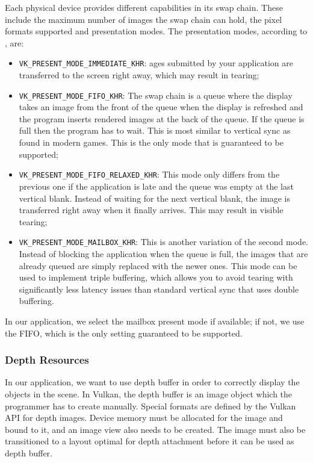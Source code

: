 Each physical device provides different capabilities in its swap chain. These include the maximum number of images the swap chain can hold, the pixel formats supported and presentation modes. The presentation modes, according to \cite{vulkan_tutorial}, are:
\begin{itemize}
    \item \texttt{VK\_PRESENT\_MODE\_IMMEDIATE\_KHR}: ages submitted by your application are transferred to the screen right away, which may result in tearing;
    \item \texttt{VK\_PRESENT\_MODE\_FIFO\_KHR}: The swap chain is a queue where the display takes an image from the front of the queue when the display is refreshed and the program inserts rendered images at the back of the queue. If the queue is full then the program has to wait. This is most similar to vertical sync as found in modern games. This is the only mode that is guaranteed to be supported;
    \item \texttt{VK\_PRESENT\_MODE\_FIFO\_RELAXED\_KHR}: This mode only differs from the previous one if the application is late and the queue was empty at the last vertical blank. Instead of waiting for the next vertical blank, the image is transferred right away when it finally arrives. This may result in visible tearing;
    \item \texttt{VK\_PRESENT\_MODE\_MAILBOX\_KHR}: This is another variation of the second mode. Instead of blocking the application when the queue is full, the images that are already queued are simply replaced with the newer ones. This mode can be used to implement triple buffering, which allows you to avoid tearing with significantly less latency issues than standard vertical sync that uses double buffering.
\end{itemize}

In our application, we select the mailbox present mode if available; if not, we use the FIFO, which is the only setting guaranteed to be supported.

\subsubsection{Depth Resources}
In our application, we want to use depth buffer in order to correctly display the objects in the scene. In Vulkan, the depth buffer is an image object which the programmer has to create manually. Special formats are defined by the Vulkan API for depth images. Device memory must be allocated for the image and bound to it, and an image view also needs to be created. The image must also be transitioned to a layout optimal for depth attachment before it can be used as depth buffer.

